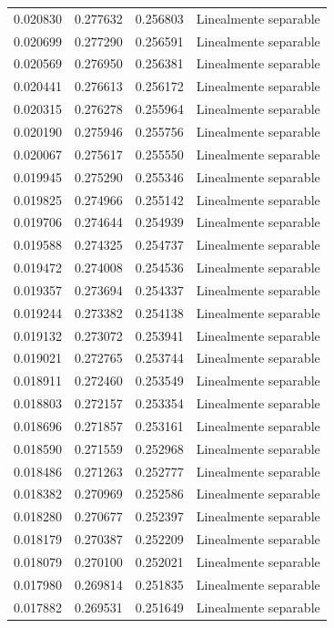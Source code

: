 \begin{tabular}{llll}
0.020830 & 0.277632 & 0.256803 & Linealmente separable \\
0.020699 & 0.277290 & 0.256591 & Linealmente separable \\
0.020569 & 0.276950 & 0.256381 & Linealmente separable \\
0.020441 & 0.276613 & 0.256172 & Linealmente separable \\
0.020315 & 0.276278 & 0.255964 & Linealmente separable \\
0.020190 & 0.275946 & 0.255756 & Linealmente separable \\
0.020067 & 0.275617 & 0.255550 & Linealmente separable \\
0.019945 & 0.275290 & 0.255346 & Linealmente separable \\
0.019825 & 0.274966 & 0.255142 & Linealmente separable \\
0.019706 & 0.274644 & 0.254939 & Linealmente separable \\
0.019588 & 0.274325 & 0.254737 & Linealmente separable \\
0.019472 & 0.274008 & 0.254536 & Linealmente separable \\
0.019357 & 0.273694 & 0.254337 & Linealmente separable \\
0.019244 & 0.273382 & 0.254138 & Linealmente separable \\
0.019132 & 0.273072 & 0.253941 & Linealmente separable \\
0.019021 & 0.272765 & 0.253744 & Linealmente separable \\
0.018911 & 0.272460 & 0.253549 & Linealmente separable \\
0.018803 & 0.272157 & 0.253354 & Linealmente separable \\
0.018696 & 0.271857 & 0.253161 & Linealmente separable \\
0.018590 & 0.271559 & 0.252968 & Linealmente separable \\
0.018486 & 0.271263 & 0.252777 & Linealmente separable \\
0.018382 & 0.270969 & 0.252586 & Linealmente separable \\
0.018280 & 0.270677 & 0.252397 & Linealmente separable \\
0.018179 & 0.270387 & 0.252209 & Linealmente separable \\
0.018079 & 0.270100 & 0.252021 & Linealmente separable \\
0.017980 & 0.269814 & 0.251835 & Linealmente separable \\
0.017882 & 0.269531 & 0.251649 & Linealmente separable \\

\end{tabular}
